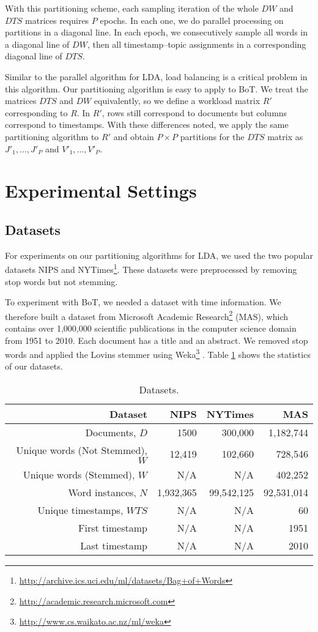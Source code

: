 \documentclass[10pt,conference]{IEEEtran}
\begin{document}
With this partitioning scheme, each sampling iteration of the whole $DW$ and $DTS$ matrices requires $P$ epochs. In each one, we do parallel processing on partitions in a diagonal line. In each epoch, we consecutively sample all words in a diagonal line of $DW$, then all timestamp--topic assignments in a corresponding diagonal line of $DTS$.

Similar to the parallel algorithm for LDA, load balancing is a critical problem in this algorithm. Our partitioning algorithm is easy to apply to BoT. We treat the matrices $DTS$ and $DW$ equivalently, so we define a workload matrix $R'$ corresponding to $R$. In $R'$, rows still correspond to documents but columns correspond to timestamps. With these differences noted, we apply the same partitioning algorithm to $R'$ and obtain $P \times P$ partitions for the $DTS$ matrix as $J'_1, \ldots, J'_P$ and $V'_1, \ldots, V'_P$.

\section{Experimental Settings}
\subsection{Datasets}
For experiments on our partitioning algorithms for LDA, we used the two popular datasets NIPS and NYTimes\footnote{\url{http://archive.ics.uci.edu/ml/datasets/Bag+of+Words}}. These datasets were preprocessed by removing stop words but not stemming.

To experiment with BoT, we needed a dataset with time information. We therefore built a dataset from Microsoft Academic Research\footnote{\url{http://academic.research.microsoft.com}} (MAS), which contains over 1,000,000 scientific publications in the computer science domain from 1951 to 2010. Each document has a title and an abstract. We removed stop words and applied the Lovins stemmer using Weka\footnote{\url{http://www.cs.waikato.ac.nz/ml/weka}} \cite{lovins1968development}. Table \ref{tab:Dataset} shows the statistics of our datasets.

\begin{table}[htbp]
  \centering
  \caption{Datasets.}
    \begin{tabular}{r|r|r|r}
    \hline
    Dataset & NIPS & NYTimes & MAS \\
    \hline
    Documents, $D$ & 1500 & 300,000 & 1,182,744 \\
    Unique words (Not Stemmed), $W$ & 12,419 & 102,660 & 728,546 \\
    Unique words (Stemmed), $W$ & N/A   & N/A   & 402,252 \\
    Word instances, $N$ & 1,932,365 & 99,542,125 & 92,531,014 \\
    Unique timestamps, $WTS$ & N/A   & N/A   & 60 \\
    First timestamp & N/A   & N/A   & 1951 \\
    Last timestamp & N/A   & N/A   & 2010 \\
	\hline
    \end{tabular}\label{tab:Dataset}\end{table}
\end{document}
